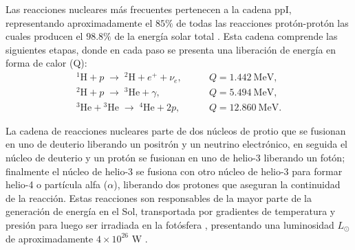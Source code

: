 Las reacciones nucleares más frecuentes pertenecen a la cadena ppI, representando aproximadamente el $85\%$ de todas las reacciones protón-protón las cuales producen el $98.8\%$ de la energía solar total \parencite[e.g.,][]{stix-2002, bahcall-1988}. Esta cadena comprende las siguientes etapas, donde en cada paso se presenta una liberación de energía en forma de calor (Q):
\begin{align*}
{}^{1}\mathrm{H} + p \;\rightarrow\; {}^{2}\mathrm{H} + e^{+} + \nu_e,&
\qquad Q = 1.442~\mathrm{MeV}, \\[6pt]
{}^{2}\mathrm{H} + p \;\rightarrow\; {}^{3}\mathrm{He} + \gamma,&
\qquad Q = 5.494~\mathrm{MeV}, \\[6pt]
{}^{3}\mathrm{He} + {}^{3}\mathrm{He} \;\rightarrow\; {}^{4}\mathrm{He} + 2p,&
\qquad Q = 12.860~\mathrm{MeV}.
\end{align*}

La cadena de reacciones nucleares parte de dos núcleos de protio que se fusionan en uno de deuterio liberando un positrón y un neutrino electrónico, en seguida el núcleo de deuterio y un protón se fusionan en uno de helio-3 liberando un fotón; finalmente el núcleo de helio-3 se fusiona con otro núcleo de helio-3 para formar helio-4 o partícula alfa ($\alpha$), liberando dos protones que aseguran la continuidad de la reacción. Estas reacciones son responsables de la mayor parte de la generación de energía en el Sol, transportada por gradientes de temperatura y presión para luego ser irradiada en la fotósfera \parencite[e.g.,][]{hughes-2007}, presentando una luminosidad $L_\odot$ de aproximadamente $4\times10^{26}$ W \parencite[e.g.,][]{judge-2020}.

